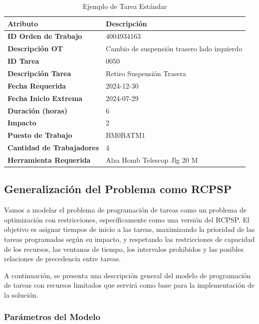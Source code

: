 \documentclass{article}
\begin{document}
\begin{table}[h!]
    \centering
    \captionsetup{justification=centering}
    \vspace{0.5cm}
    \begin{tabular}{p{6cm} p{8cm}}
        \toprule
        \textbf{Atributo} & \textbf{Descripción} \\
        \midrule
        \textbf{ID Orden de Trabajo} & 4004934163 \\
        \textbf{Descripción OT} & Cambio de suspensión trasero lado izquierdo \\
        \textbf{ID Tarea} & 0050 \\
        \textbf{Descripción Tarea} & Retiro Suspensión Trasera \\
        \textbf{Fecha Requerida} & 2024-12-30 \\
        \textbf{Fecha Inicio Extrema} & 2024-07-29 \\
        \textbf{Duración (horas)} & 6 \\
        \textbf{Impacto} & 2 \\
        \textbf{Puesto de Trabajo} & BM0BATM1 \\
        \textbf{Cantidad de Trabajadores} & 4 \\
        \textbf{Herramienta Requerida} & Alza Homb Telescop Jlg 20 M \\
        \bottomrule
    \end{tabular}
    \caption{Ejemplo de Tarea Estándar}
    \label{table:task}
\end{table}


\subsection{Generalización del Problema como RCPSP}

Vamos a modelar el problema de programación de tareas como un problema de optimización con restricciones, específicamente como una versión del RCPSP. El objetivo es asignar tiempos de inicio a las tareas, maximizando la prioridad de las tareas programadas según su impacto, y respetando las restricciones de capacidad de los recursos, las ventanas de tiempo, los intervalos prohibidos y las posibles relaciones de precedencia entre tareas.

A continuación, se presenta una descripción general del modelo de programación de tareas con recursos limitados que servirá como base para la implementación de la solución.

\subsubsection{Parámetros del Modelo}
\end{document}

